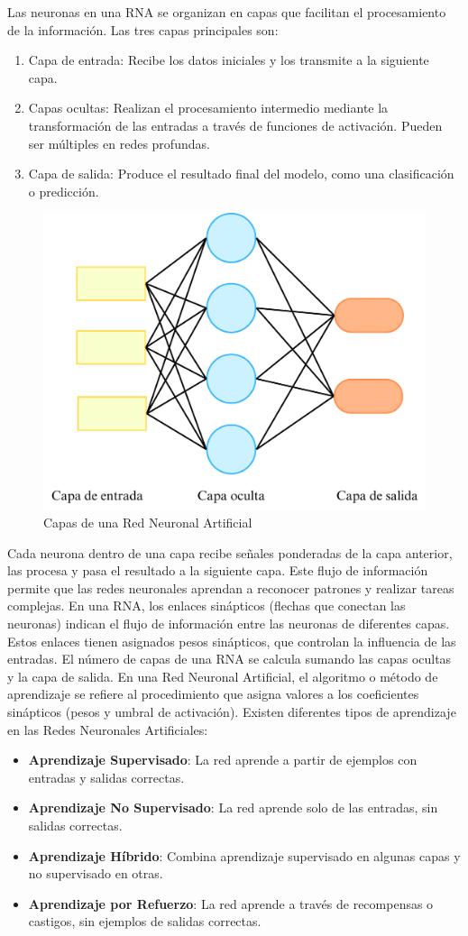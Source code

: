 Las neuronas en una RNA se organizan en capas que facilitan el procesamiento de la información. Las tres capas principales son:
\begin{enumerate}
    \item Capa de entrada: Recibe los datos iniciales y los transmite a la siguiente capa.
    \item Capas ocultas: Realizan el procesamiento intermedio mediante la transformación de las entradas a través de funciones de activación. Pueden ser múltiples en redes profundas.
    \item Capa de salida: Produce el resultado final del modelo, como una clasificación o predicción.
\end{enumerate}

\begin{figure}[H]
        \centering
        \includegraphics[width=0.6\linewidth]{Documento/Imagenes/Marco Teorico/RNA.pdf}
        \caption{Capas de una Red Neuronal Artificial}
        \label{fig:RNA}
\end{figure}

Cada neurona dentro de una capa recibe señales ponderadas de la capa anterior, las procesa y pasa el resultado a la siguiente capa. Este flujo de información permite que las redes neuronales aprendan a reconocer patrones y realizar tareas complejas.
En una RNA, los enlaces sinápticos (flechas que conectan las neuronas) indican el flujo de información entre las neuronas de diferentes capas. Estos enlaces tienen asignados pesos sinápticos, que controlan la influencia de las entradas. El número de capas de una RNA se calcula sumando las capas ocultas y la capa de salida.
En una Red Neuronal Artificial, el algoritmo o método de aprendizaje se refiere al procedimiento que asigna valores a los coeficientes sinápticos (pesos y umbral de activación). 
Existen diferentes tipos de aprendizaje en las Redes Neuronales Artificiales\cite{centeno2019deep}:
\begin{itemize}
    \item \textbf{Aprendizaje Supervisado}: La red aprende a partir de ejemplos con entradas y salidas correctas.
    \item \textbf{Aprendizaje No Supervisado}: La red aprende solo de las entradas, sin salidas correctas.
    \item \textbf{Aprendizaje Híbrido}: Combina aprendizaje supervisado en algunas capas y no supervisado en otras.
    \item \textbf{Aprendizaje por Refuerzo}: La red aprende a través de recompensas o castigos, sin ejemplos de salidas correctas.
\end{itemize}

